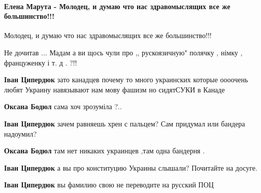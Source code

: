  
 
 
 
 
\paragraph{Елена Марута - Молодец, и думаю что нас здравомыслящих все же большинство!!!}
\label{sec:18_06_2020.fb.zharkih_ekaterina.1.mova_jazyk.cmt.maruta_zdravomyslie}

\begin{itemize}
Молодец, и думаю что нас здравомыслящих все же большинство!!!

Не дочитав ... Мадам а ви щось чули про ,, рускоязичную" полячку , німку , француженку і т. д . ?!!

\begin{itemize}
\textbf{Іван Ципердюк} зато канадцев почему то много украинских которые оооочень любят Украину навязывают нам мову фашизм но сидятСУКИ в Канаде

\textbf{Оксана Бодюл} сама хоч зрозуміла ?..

\textbf{Іван Ципердюк} зачем равняешь хрен с пальцем? Сам придумал или бандера надоумил?

\textbf{Оксана Бодюл} там нет никаких украинцев ,там одна бандерня .

\textbf{Іван Ципердюк} а вы про конституцию Украины слышали? Почитайте на досуге.

\textbf{Іван Ципердюк} вы фамилию свою не переводите на русский ПОЦ


\end{itemize}
\end{itemize}
